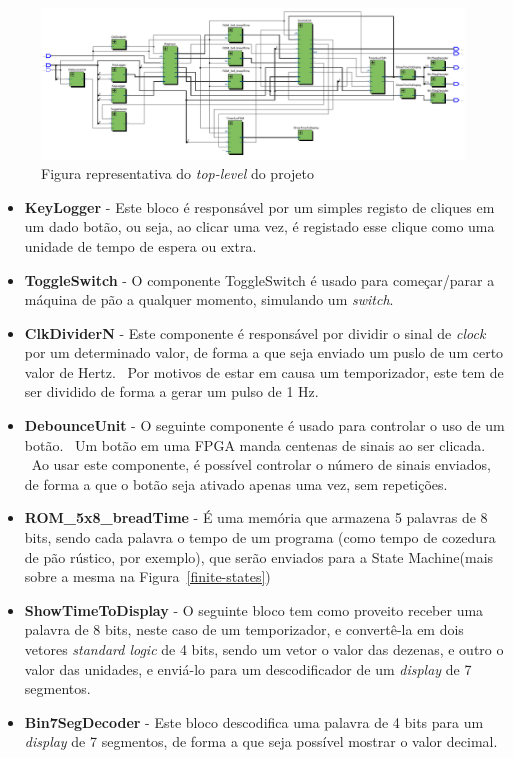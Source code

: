 \documentclass{article}
\begin{document}
        \begin{figure}[H]
            \label{fig:bread-machine}
            \centering
            \includegraphics[scale=0.6]{BreadMachine3}
            \caption{Figura representativa do \textit{top-level} do projeto}
        \end{figure}

        \begin{itemize}
            \item[\textbf{\textrightarrow}] \textbf{KeyLogger} - Este bloco é responsável por um simples registo de cliques em um dado botão, ou seja, ao clicar uma vez, é registado esse clique como uma unidade de tempo de espera ou extra.
            \item[\textbf{\textrightarrow}] \textbf{ToggleSwitch} - O componente ToggleSwitch é usado para começar/parar a máquina de pão a qualquer momento, simulando um \textit{switch}.
            \item[\textbf{\textrightarrow}] \textbf{ClkDividerN} - Este componente é responsável por dividir o sinal de \textit{clock} por um determinado valor, de forma a que seja enviado um puslo  de um certo valor de Hertz. \ Por motivos de estar em causa um temporizador, este tem de ser dividido de forma a gerar um pulso de 1 Hz.
            \item[\textbf{\textrightarrow}] \textbf{DebounceUnit} - O seguinte componente é usado para controlar o uso de um botão. \ Um botão em uma FPGA manda centenas de sinais ao ser clicada. \ Ao usar este componente, é possível controlar o número de sinais enviados, de forma a que o botão seja ativado apenas uma vez, sem repetições.
            \item[\textbf{\textrightarrow}] \textbf{ROM\_5x8\_breadTime} - É uma memória que armazena 5 palavras de 8 bits, sendo cada palavra o tempo de um programa (como tempo de cozedura de pão rústico, por exemplo), que serão enviados para a State Machine(mais sobre a mesma na Figura~\ref{finite-states})
            \item[\textbf{\textrightarrow}] \textbf{ShowTimeToDisplay} - O seguinte bloco tem como proveito receber uma palavra de 8 bits, neste caso de um temporizador, e convertê-la em dois vetores \textit{standard logic} de 4 bits, sendo um vetor o valor das dezenas, e outro o valor das unidades, e enviá-lo para um descodificador de um \textit{display} de 7 segmentos.
            \item[\textbf{\textrightarrow}] \textbf{Bin7SegDecoder} - Este bloco descodifica uma palavra de 4 bits para um \textit{display} de 7 segmentos, de forma a que seja possível mostrar o valor decimal.
        \end{itemize}
\end{document}
